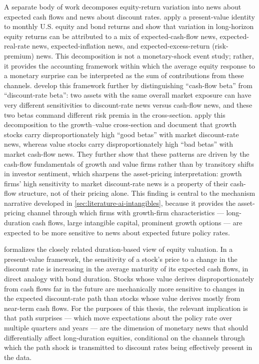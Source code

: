 A separate body of work decomposes equity-return variation into news
about expected cash flows and news about discount rates.
 apply a present-value identity to monthly
U.S. equity and bond returns and show that variation in long-horizon
equity returns can be attributed to a mix of expected-cash-flow news,
expected-real-rate news, expected-inflation news, and expected-excess-return
(risk-premium) news. This decomposition is not a monetary-shock event
study; rather, it provides the accounting framework within which the
average equity response to a monetary surprise can be interpreted as
the sum of contributions from these channels. 
develop this framework further by distinguishing ``cash-flow beta''
from ``discount-rate beta'': two assets with the same overall market
exposure can have very different sensitivities to discount-rate news
versus cash-flow news, and these two betas command different risk
premia in the cross-section.  apply this decomposition to the growth--value cross-section and document that growth stocks carry
disproportionately high ``good betas'' with market discount-rate
news, whereas value stocks carry disproportionately high ``bad
betas'' with market cash-flow news. They further show that these
patterns are driven by the cash-flow fundamentals of growth and
value firms rather than by transitory shifts in investor sentiment,
which sharpens the asset-pricing interpretation: growth firms' high
sensitivity to market discount-rate news is a property of their
cash-flow structure, not of their pricing alone. This finding is
central to the mechanism narrative developed in
\cref{sec:literature-ai-intangibles}, because it provides the
asset-pricing channel through which firms with growth-firm
characteristics --- long-duration cash flows, large intangible
capital, prominent growth options --- are expected to be more
sensitive to news about expected future policy rates.

 formalizes the closely related
duration-based view of equity valuation. In a present-value framework,
the sensitivity of a stock's price to a change in the discount rate is
increasing in the average maturity of its expected cash flows, in
direct analogy with bond duration. Stocks whose value derives
disproportionately from cash flows far in the future are mechanically
more sensitive to changes in the expected discount-rate path than
stocks whose value derives mostly from near-term cash flows. For the
purposes of this thesis, the relevant implication is that path
surprises --- which move expectations about the policy rate over
multiple quarters and years --- are the dimension of monetary news
that should differentially affect long-duration equities, conditional
on the channels through which the path shock is transmitted to
discount rates being effectively present in the data.

